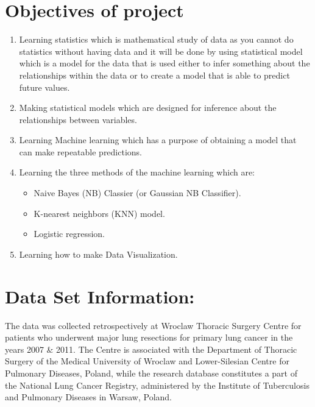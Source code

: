\documentclass[a4paper, 11pt, oneside]{article} %
\begin{document}
\section{Objectives of project }
\begin{enumerate}

\item Learning statistics which is mathematical study of data as you cannot do statistics without having data and it will be done by using statistical model which is a model for the data that is used either to infer something about the relationships within the data or to create a model that is able to predict future values. 
\item Making statistical models which are designed for inference about the relationships between variables.
\item Learning Machine learning which has a purpose of obtaining a model that can make repeatable predictions. 
\item Learning the three methods of the machine learning which are:
\begin{itemize}
\item Naive Bayes (NB) Classier (or Gaussian NB Classifier).
\item K-nearest neighbors (KNN) model.
\item Logistic regression.
\end{itemize}
\item Learning how to make Data Visualization.

\end{enumerate}
\section{Data Set Information:} 

The data was collected retrospectively at Wroclaw Thoracic Surgery Centre for patients who underwent major lung resections for primary lung cancer in the years 2007 \& 2011. The Centre is associated with the Department of Thoracic Surgery of the Medical University of Wroclaw and Lower-Silesian Centre for Pulmonary Diseases, Poland, while the research database constitutes a part of the National Lung Cancer Registry, administered by the Institute of Tuberculosis and Pulmonary Diseases in Warsaw, Poland.
\end{document}
